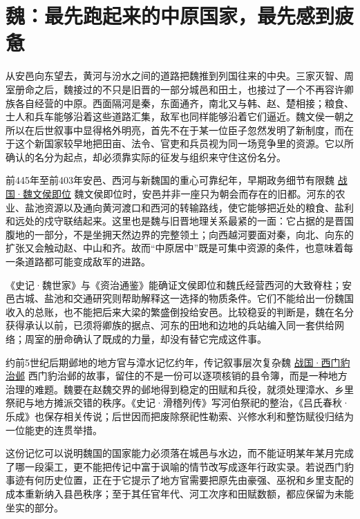 \section{魏：最先跑起来的中原国家，最先感到疲惫}

从安邑向东望去，黄河与汾水之间的道路把魏推到列国往来的中央。三家灭智、周室册命之后，魏接过的不只是旧晋的一部分城邑和田土，也接过了一个不再容许卿族各自经营的中原。西面隔河是秦，东面通齐，南北又与韩、赵、楚相接；粮食、士人和兵车能够沿着这些道路汇集，敌军也同样能够沿着它们逼近。魏文侯一朝之所以在后世叙事中显得格外明亮，首先不在于某一位臣子忽然发明了新制度，而在于这个新国家较早地把田亩、法令、官吏和兵员视为同一场竞争里的资源。它以所确认的名分为起点，却必须靠实际的征发与组织来守住这份名分。

\begingroup
\let\visibleeventanchor\eventanchor
{}
\renewcommand{\visibleeventanchor}[2]{\hyperlink{evt:#1}{#2}}
\begin{event}{前445年至前403年}{安邑、西河与新魏国的重心}{可靠纪年，早期政务细节有限}{魏}
\visibleeventanchor{WQ-0445-WEI-WENHOU-ASCEND}{战国·魏文侯即位}
魏文侯即位时，安邑并非一座只为朝会而存在的旧都。河东的农业、盐池资源以及通向黄河渡口和西河的转输路线，使它能够把近处的粮食、盐利和远处的戍守联结起来。这里也是魏与旧晋地理关系最紧的一面：它占据的是晋国腹地的一部分，不是坐拥天然边界的完整领土；向西越河要面对秦，向北、向东的扩张又会触动赵、中山和齐。故而“中原居中”既是可集中资源的条件，也意味着每一条道路都可能变成敌军的进路。

《史记·魏世家》与《资治通鉴》能确证文侯即位和魏氏经营西河的大致脊柱；安邑古城、盐池和交通研究则帮助解释这一选择的物质条件。它们不能给出一份魏国收入的总账，也不能把后来大梁的繁盛倒投给安邑。比较稳妥的判断是，魏在名分获得承认以前，已须将卿族的据点、河东的田地和边地的兵站编入同一套供给网络；周室的册命确认了既成的力量，却没有替它完成这件事。
\end{event}

\begin{event}{约前5世纪后期}{邺地的地方官与漳水记忆}{约年，传记叙事层次复杂}{魏}
\visibleeventanchor{WQ-0435-WEI-YE-GOVERNANCE}{战国·西门豹治邺}
西门豹治邺的故事，留住的不是一份可以逐项核销的县令簿，而是一种地方治理的难题。魏要在赵魏交界的邺地得到稳定的田赋和兵役，就须处理漳水、乡里祭祀与地方摊派交错的秩序。《史记·滑稽列传》写河伯祭祀的整治，《吕氏春秋·乐成》也保存相关传说；后世因而把废除祭祀性勒索、兴修水利和整饬赋役归结为一位能吏的连贯举措。

这份记忆可以说明魏国的国家能力必须落在城邑与水边，而不能证明某年某月完成了哪一段渠工，更不能把传记中富于讽喻的情节改写成逐年行政实录。若说西门豹事迹有何历史位置，正在于它提示了地方官需要把原先由豪强、巫祝和乡里支配的成本重新纳入县邑秩序；至于其任官年代、河工次序和田赋数额，都应保留为未能坐实的部分。
\end{event}

